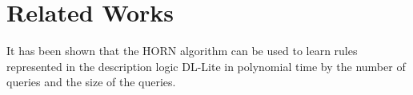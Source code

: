 \chapter{Related Works}
It has been shown that the HORN algorithm can be used to learn rules represented in the description logic DL-Lite in polynomial time by the number of queries and the size of the queries. \cite{DL_lite} 
